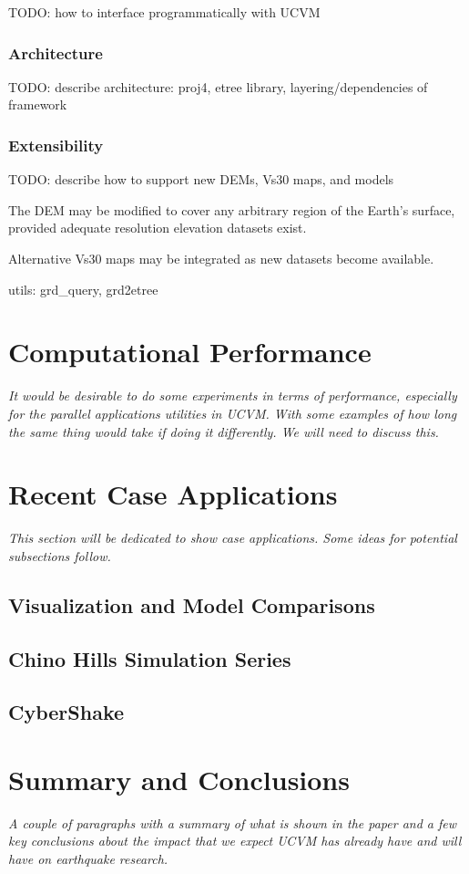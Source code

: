 TODO: how to interface programmatically with UCVM

\subsubsection{Architecture}

TODO: describe architecture: proj4, etree library, layering/dependencies of framework

\subsubsection{Extensibility}

TODO: describe how to support new DEMs, Vs30 maps, and models

The DEM may be modified to cover any arbitrary region of the Earth's surface, provided adequate resolution elevation datasets exist.

Alternative Vs30 maps may be integrated as new datasets become available. 

utils: grd\_query, grd2etree

\section{Computational Performance}
\label{sec:conclusions}

\textit{
\color{blue}
It would be desirable to do some experiments in terms of performance, especially for the parallel applications utilities in UCVM. With some examples of how long the same thing would take if doing it differently. We will need to discuss this.
}

\section{Recent Case Applications}
\label{sec:conclusions}

\textit{
\color{blue}
This section will be dedicated to show case applications. Some ideas for potential subsections follow.
}

\subsection{Visualization and Model Comparisons}

\subsection{Chino Hills Simulation Series}

\subsection{CyberShake}

\section{Summary and Conclusions}
\label{sec:conclusions}

\textit{
\color{blue}
A couple of paragraphs with a summary of what is shown in the paper and a few key conclusions about the impact that we expect UCVM has already have and will have on earthquake research.
}

